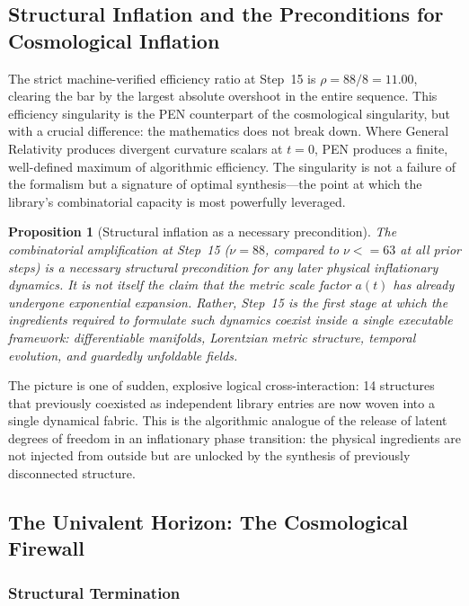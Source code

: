 \documentclass[11pt,a4paper]{article}
\def\leq{<=}%
\theoremstyle{plain}
\newtheorem{proposition}[theorem]{Proposition}
\theoremstyle{definition}
\theoremstyle{remark}
\begin{document}
\subsection{Structural Inflation and the Preconditions for Cosmological Inflation}
\label{sec:inflation}

The strict machine-verified efficiency ratio at Step~15 is $\rho = 88/8 = 11.00$, clearing the bar by the largest absolute overshoot in the entire sequence.  This efficiency singularity is the PEN counterpart of the cosmological singularity, but with a crucial difference: the mathematics does not break down.  Where General Relativity produces divergent curvature scalars at $t = 0$, PEN produces a finite, well-defined maximum of algorithmic efficiency.  The singularity is not a failure of the formalism but a signature of optimal synthesis---the point at which the library's combinatorial capacity is most powerfully leveraged.

\begin{proposition}[Structural inflation as a necessary precondition]
\label{prop:inflation}
The combinatorial amplification at Step~15 ($\nu = 88$, compared to $\nu \leq 63$ at all prior steps) is a necessary structural precondition for any later physical inflationary dynamics.  It is not itself the claim that the metric scale factor $a(t)$ has already undergone exponential expansion.  Rather, Step~15 is the first stage at which the ingredients required to formulate such dynamics coexist inside a single executable framework: differentiable manifolds, Lorentzian metric structure, temporal evolution, and guardedly unfoldable fields.
\end{proposition}

The picture is one of sudden, explosive logical cross-interaction: 14 structures that previously coexisted as independent library entries are now woven into a single dynamical fabric.  This is the algorithmic analogue of the release of latent degrees of freedom in an inflationary phase transition: the physical ingredients are not injected from outside but are unlocked by the synthesis of previously disconnected structure.


\subsection{The Univalent Horizon: The Cosmological Firewall}
\label{sec:horizon}

\subsubsection{Structural Termination}
\end{document}
